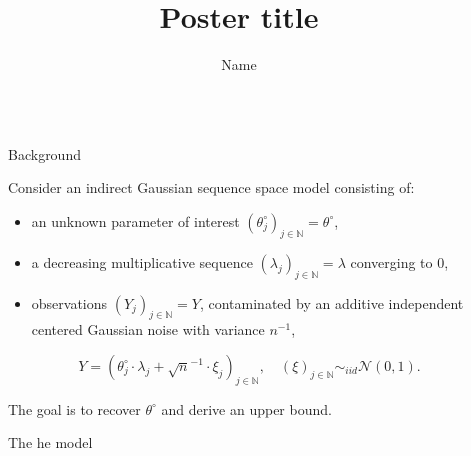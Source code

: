 \documentclass[final,hyperref={pdfpagelabels=false}]{beamer}
\title{\Huge Poster title} %
\author{Name} %
\institute{Supervisor} %
\begin{document}

\begin{frame}[t] %

\begin{columns}[t] %

\begin{column}{.02\textwidth}\end{column} %

\begin{column}{.30\textwidth} %

\begin{block}{\rule{0pt}{2.5ex} Background}
Consider an indirect Gaussian sequence space model consisting of:
\begin{itemize}
\item an unknown parameter of interest $\left(\theta^{\circ}_{j}\right)_{j \in \mathbb{N}} = \theta^{\circ}$,
\item a decreasing multiplicative sequence $\left(\lambda_{j}\right)_{j \in \mathbb{N}} = \lambda$ converging to $0$,
\item observations $\left(Y_{j}\right)_{j \in \mathbb{N}} = Y$, contaminated by an additive independent centered Gaussian noise with variance $n^{-1}$,
\end{itemize}
\[Y = \left(\theta^{\circ}_{j} \cdot \lambda_{j} + \sqrt{n}^{-1} \cdot \xi_{j}\right)_{j \in \mathbb{N}}, \quad \left(\xi\right)_{j \in \mathbb{N}} \sim_{iid} \mathcal{N}\left(0, 1\right).\]

The goal is to recover $\theta^{\circ}$ and derive an upper bound.
\end{block}

\begin{block}{\rule{0pt}{2.5ex} The he model}


\end{block}
\end{column}
\end{columns}
\end{frame}
\end{document}
